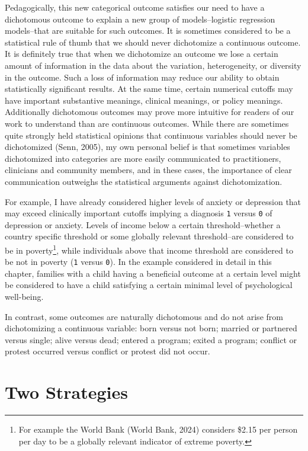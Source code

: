 \documentclass[
  letterpaper,
  DIV=11,
  numbers=noendperiod]{scrreprt}
\begin{document}
Pedagogically, this new categorical outcome satisfies our need to have a
dichotomous outcome to explain a new group of models--logistic
regression models--that are suitable for such outcomes. It is sometimes
considered to be a statistical rule of thumb that we should never
dichotomize a continuous outcome. It is definitely true that when we
dichotomize an outcome we lose a certain amount of information in the
data about the variation, heterogeneity, or diversity in the outcome.
Such a loss of information may reduce our ability to obtain
statistically significant results. At the same time, certain numerical
cutoffs may have important substantive meanings, clinical meanings, or
policy meanings. Additionally dichotomous outcomes may prove more
intuitive for readers of our work to understand than are continuous
outcomes. While there are sometimes quite strongly held statistical
opinions that continuous variables should never be dichotomized (Senn,
2005), my own personal belief is that sometimes variables dichotomized
into categories are more easily communicated to practitioners,
clinicians and community members, and in these cases, the importance of
clear communication outweighs the statistical arguments against
dichotomization.

For example, I have already considered higher levels of anxiety or
depression that may exceed clinically important cutoffs implying a
diagnosis \texttt{1} versus \texttt{0} of depression or anxiety. Levels
of income below a certain threshold--whether a country specific
threshold or some globally relevant threshold--are considered to be in
poverty\footnote{For example the World Bank (World Bank, 2024) considers
  \$2.15 per person per day to be a globally relevant indicator of
  extreme poverty.}, while individuals above that income threshold are
considered to be not in poverty (\texttt{1} versus \texttt{0}). In the
example considered in detail in this chapter, families with a child
having a beneficial outcome at a certain level might be considered to
have a child satisfying a certain minimal level of psychological
well-being.

In contrast, some outcomes are naturally dichotomous and do not arise
from dichotomizing a continuous variable: born versus not born; married
or partnered versus single; alive versus dead; entered a program; exited
a program; conflict or protest occurred versus conflict or protest did
not occur.

\section{Two Strategies}\label{two-strategies}
\end{document}
